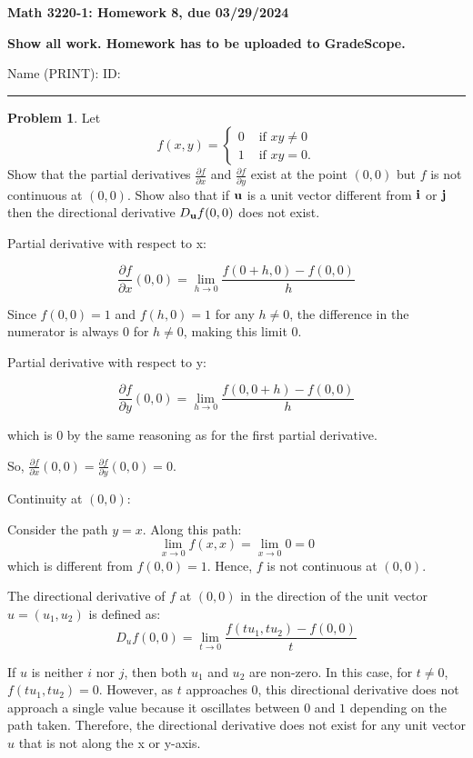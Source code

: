 \documentclass[12]{amsart}
\theoremstyle{definition}
\newtheorem{xca}{Problem}
\newcommand{\der}[2]{\frac{\partial#1}{\partial #2}}
\begin{document}
\centerline{ \bf Math 3220-1: Homework 8, due 03/29/2024}
\bigskip
\centerline{ \bf Show all work. Homework has to be uploaded to GradeScope.}
\bigskip
\noindent Name (PRINT):\hskip 2.5in ID:
\smallskip

\hrule

\bigskip


\begin{xca}
Let
$$
f(x,y)=
\begin{cases}
0 &\text{ if $xy\neq 0 $} \\
1 & \text{ if $xy=0.$}
\end{cases}
$$
Show that the partial derivatives $\der{f}{x}$ and $\der{f}{y}$ exist at the point $(0,0)$ but $f$ is not continuous at $(0,0)$. Show also that if $\bf{u}$ is a unit vector different from $\bf{i}$ or $\bf{j}$ then the directional derivative $D_{\bf{u}}f(0,0)$ does not exist.

\end{xca}


Partial derivative with respect to x:

\[\frac{\partial f}{\partial x}(0, 0) = \lim_{h \to 0} \frac{f(0 + h, 0) - f(0, 0)}{h}\]

Since $f(0, 0) = 1$ and $f(h, 0) = 1$ for any $h \neq 0$, the difference
in the numerator is always $0$ for $h \neq 0$, making this limit $0$.


Partial derivative with respect to y:

\[\frac{\partial f}{\partial y}(0, 0) = \lim_{h \to 0} \frac{f(0, 0 + h) - f(0, 0)}{h}\]

which is $0$ by the same reasoning as for the first partial derivative.

So, $\frac{\partial f}{\partial x}(0, 0) = \frac{\partial f}{\partial y}(0, 0) = 0$.


Continuity at $(0, 0)$:

Consider the path $y = x$. Along this path:
\[\lim_{x \to 0} f(x, x) = \lim_{x \to 0} 0 = 0\]
which is different from $f(0, 0) = 1$. Hence, $f$ is not continuous at $(0, 0)$.


The directional derivative of $f$ at $(0, 0)$ in the direction of the unit vector
$u = (u_1, u_2)$ is defined as:
\[D_{u} f(0, 0) = \lim_{t \to 0} \frac{f(t u_1, t u_2) - f(0, 0)}{t}\]

If $u$ is neither $i$ nor $j$, then both $u_1$ and $u_2$ are non-zero. In this
case, for $t \neq 0$, $f(t u_1, t u_2) = 0$. However, as $t$ approaches $0$, this
directional derivative does not approach a single value because it oscillates between
$0$ and $1$ depending on the path taken. Therefore, the directional derivative
does not exist for any unit vector $u$ that is not along the x or y-axis.
\end{document}
